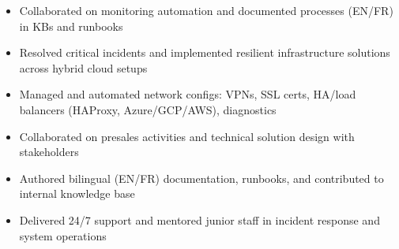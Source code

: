 \documentclass[10pt,a4paper,ragged2e,withhyper]{altacv}
\begin{document}
\begin{paracol}{2}
\begin{itemize}
\item Collaborated on monitoring automation and documented processes (EN/FR) in KBs and runbooks

\end{itemize}

\divider

\begin{itemize}
\item Resolved critical incidents and implemented resilient infrastructure solutions across hybrid cloud setups
\item Managed and automated network configs: VPNs, SSL certs, HA/load balancers (HAProxy, Azure/GCP/AWS), diagnostics
\item Collaborated on presales activities and technical solution design with stakeholders
\item Authored bilingual (EN/FR) documentation, runbooks, and contributed to internal knowledge base
\item Delivered 24/7 support and mentored junior staff in incident response and system operations
\end{itemize}

\switchcolumn



\end{paracol}
\end{document}
